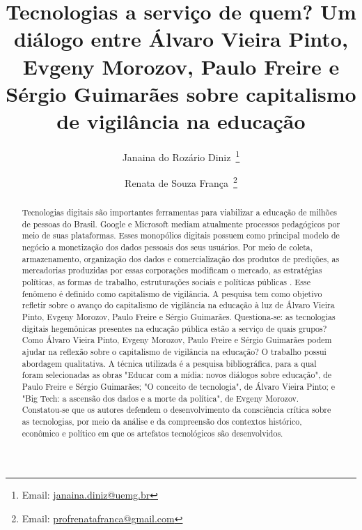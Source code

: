 \documentclass[portuguese]{textolivre}
\title{Tecnologias a serviço de quem? Um diálogo entre Álvaro Vieira Pinto, Evgeny Morozov, Paulo Freire e Sérgio Guimarães sobre capitalismo de vigilância na educação}
\author[1]{Janaina do Rozário Diniz~\orcid{0000-0001-7993-5447}\thanks{Email: \href{mailto:janaina.diniz@uemg.br}{janaina.diniz@uemg.br}}}
\author[1]{Renata de Souza França~\orcid{0000-0002-3809-0975}\thanks{Email: \href{mailto:profrenatafranca@gmail.com}{profrenatafranca@gmail.com}}}
\affil[1]{Universidade do Estado de Minas Gerais, Departamento de Ciências Humanas e Fundamentos da Educação, Ibirité, Minas Gerais, Brasil.}
\begin{document}
\maketitle

\begin{polyabstract}
\begin{abstract}
Tecnologias digitais são importantes ferramentas para viabilizar a educação de milhões de pessoas do Brasil. Google e Microsoft mediam atualmente processos pedagógicos por meio de suas plataformas. Esses monopólios digitais possuem como principal modelo de negócio a monetização dos dados pessoais dos seus usuários. Por meio de coleta, armazenamento, organização dos dados e comercialização dos produtos de predições, as mercadorias produzidas por essas corporações modificam o mercado, as estratégias políticas, as formas de trabalho, estruturações sociais e políticas públicas \cite{cruz_neoliberalismo_2020}. Esse fenômeno é definido como capitalismo de vigilância. A pesquisa tem como objetivo refletir sobre o avanço do capitalismo de vigilância na educação à luz de Álvaro Vieira Pinto, Evgeny Morozov, Paulo Freire e Sérgio Guimarães. Questiona-se: as tecnologias digitais hegemônicas presentes na educação pública estão a serviço de quais grupos? Como Álvaro Vieira Pinto, Evgeny Morozov, Paulo Freire e Sérgio Guimarães podem ajudar na reflexão sobre o capitalismo de vigilância na educação? O trabalho possui abordagem qualitativa. A técnica utilizada é a pesquisa bibliográfica, para a qual foram selecionadas as obras "Educar com a mídia: novos diálogos sobre educação", de Paulo Freire e Sérgio Guimarães; "O conceito de tecnologia", de Álvaro Vieira Pinto; e "Big Tech: a ascensão dos dados e a morte da política", de Evgeny Morozov. Constatou-se que os autores defendem o desenvolvimento da consciência crítica sobre as tecnologias, por meio da análise e da compreensão dos contextos histórico, econômico e político em que os artefatos tecnológicos são desenvolvidos.

\end{abstract}


\end{polyabstract}
\end{document}
